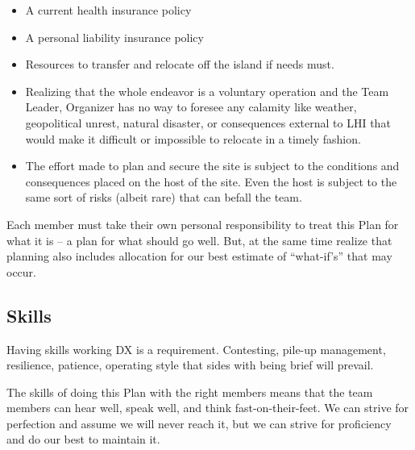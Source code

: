 \documentclass[11pt]{article}
\begin{document}
\begin{itemize}
\item A current health insurance policy
\item A personal liability insurance policy
\item Resources to transfer and relocate off
the island if needs must.
\item Realizing that the whole endeavor is a voluntary
operation and the Team Leader, Organizer has no
way to foresee any calamity like weather, geopolitical
unrest, natural disaster, or consequences external
to LHI that would make it difficult or impossible
to relocate in a timely fashion.
\item The effort made to plan and secure the site
is subject to the conditions and consequences placed
on the host of the site.  Even the host is subject
to the same sort of risks (albeit rare) that can 
befall the team.
\end{itemize}

Each member must take their own personal responsibility to
treat this Plan for what it is -- a plan for what
should go well.   But, at the same time realize that
planning also includes allocation for our best
estimate of ``what-if's'' that may occur.
   
\subsection{Skills}
Having skills working DX is a requirement.  Contesting,
pile-up management, resilience, patience, operating
style that sides with being brief will prevail.
\par
The skills of doing this Plan with the right members
means that the team members can hear well, speak well,
and think fast-on-their-feet.  We can strive for
perfection and assume we will never reach it, but we
can strive for proficiency and do our best to maintain
it.
\end{document}

